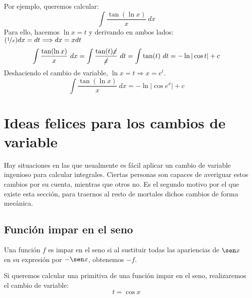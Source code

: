 \begin{ejemplo}
    Por ejemplo, queremos calcular:
    \begin{equation*}
        \displaystyle\int \dfrac{\tan(\ln x)}{x}~dx 
    \end{equation*}
    Para ello, hacemos $\ln x = t$ y derivando en ambos lados: $(\nicefrac{1}{x})dx = dt \Longrightarrow dx = xdt$
    \begin{equation*}
        \displaystyle\int \dfrac{\tan(\ln x)}{x}~dx = \displaystyle\int \dfrac{\tan(t)\cancel{x}}{\cancel{x}}~dt = \displaystyle\int \tan(t)~dt = -\ln |\cos t| + c
    \end{equation*}
    Deshaciendo el cambio de variable, $\ln x = t \Longrightarrow x = e^t$.
    \begin{equation*}
        \displaystyle\int \dfrac{\tan(\ln x)}{x}~dx = -\ln |\cos e^x| + c
    \end{equation*}
\end{ejemplo}

\section{Ideas felices para los cambios de variable}
Hay situaciones en las que usualmente es fácil aplicar un cambio de variable ingenioso para calcular integrales. Ciertas personas son capaces de averiguar estos cambios por su cuenta, mientras que otros no. Es el segundo motivo por el que existe esta sección, para traernos al resto de mortales dichos cambios de forma mecánica.

\subsection{Función impar en el seno}
\begin{definicion}
    Una función $f$ es impar en el seno si al sustituir todas las apariencias de $\sen x$ en su expresión por $-\sen x$, obtenemos $-f$.
\end{definicion}
Si queremos calcular una primitiva de una función impar en el seno, realizaremos el cambio de variable:
\begin{equation*}
    t = \cos x
\end{equation*}

